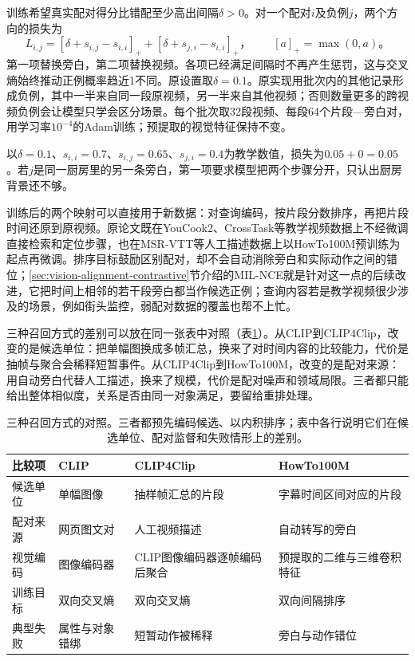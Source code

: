 训练希望真实配对得分比错配至少高出间隔$\delta>0$。对一个配对$i$及负例$j$，两个方向的损失为
\begin{equation}
  L_{i,j}=[\delta+s_{i,j}-s_{i,i}]_+
          +[\delta+s_{j,i}-s_{i,i}]_+\text{，}
  \qquad [a]_+=\max(0,a)\text{。}
  \label{eq:vision-howto-ranking}
\end{equation}
第一项替换旁白，第二项替换视频。各项已经满足间隔时不再产生惩罚，这与交叉熵始终推动正例概率趋近1不同。原设置取$\delta=0.1$。原实现用批次内的其他记录形成负例，其中一半来自同一段原视频，另一半来自其他视频；否则数量更多的跨视频负例会让模型只学会区分场景。每个批次取32段视频、每段64个片段—旁白对，用学习率$10^{-4}$的Adam训练；预提取的视觉特征保持不变。

以$\delta=0.1$、$s_{i,i}=0.7$、$s_{i,j}=0.65$、$s_{j,i}=0.4$为教学数值，损失为$0.05+0=0.05$。若$j$是同一厨房里的另一条旁白，第一项要求模型把两个步骤分开，只认出厨房背景还不够。

训练后的两个映射可以直接用于新数据：对查询编码，按片段分数排序，再把片段时间还原到原视频。原论文既在YouCook2、CrossTask等教学视频数据上不经微调直接检索和定位步骤，也在MSR-VTT等人工描述数据上以HowTo100M预训练为起点再微调。排序目标鼓励区别配对，却不会自动消除旁白和实际动作之间的错位；\ref{sec:vision-alignment-contrastive}节介绍的MIL-NCE就是针对这一点的后续改进，它把时间上相邻的若干段旁白都当作候选正例；查询内容若是教学视频很少涉及的场景，例如街头监控，弱配对数据的覆盖也帮不上忙。

三种召回方式的差别可以放在同一张表中对照（表\ref{tab:vision-understanding-recall-compare}）。从CLIP到CLIP4Clip，改变的是候选单位：把单幅图换成多帧汇总，换来了对时间内容的比较能力，代价是抽帧与聚合会稀释短暂事件。从CLIP4Clip到HowTo100M，改变的是配对来源：用自动旁白代替人工描述，换来了规模，代价是配对噪声和领域局限。三者都只能给出整体相似度，关系是否由同一对象满足，要留给重排处理。

\begin{table}[htbp]
  \centering
  \small
  \begin{tabularx}{\linewidth}{@{}p{14mm}XXX@{}}
    \toprule
    比较项 & CLIP & CLIP4Clip & HowTo100M\\
    \midrule
    候选单位 & 单幅图像 & 抽样帧汇总的片段 & 字幕时间区间对应的片段\\
    配对来源 & 网页图文对 & 人工视频描述 & 自动转写的旁白\\
    视觉编码 & 图像编码器 & CLIP图像编码器逐帧编码后聚合 & 预提取的二维与三维卷积特征\\
    训练目标 & 双向交叉熵 & 双向交叉熵 & 双向间隔排序\\
    典型失败 & 属性与对象错绑 & 短暂动作被稀释 & 旁白与动作错位\\
    \bottomrule
  \end{tabularx}
  \caption{三种召回方式的对照。三者都预先编码候选、以内积排序；表中各行说明它们在候选单位、配对监督和失败情形上的差别。}
  \label{tab:vision-understanding-recall-compare}
\end{table}

